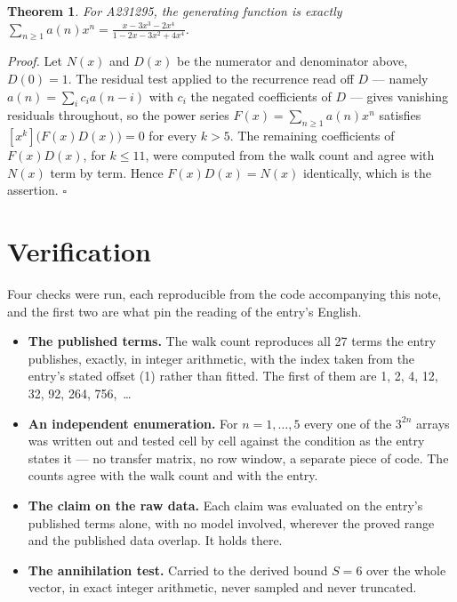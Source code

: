 \documentclass[11pt]{article}
\newtheorem{theorem}{Theorem}
\theoremstyle{definition}
\begin{document}
\begin{theorem} For A231295, the generating function is exactly $\sum_{n\ge 1} a(n)x^n = \frac{x - 3x^{3} - 2x^{4}}{1 - 2x - 3x^{2} + 4x^{4}}$.\end{theorem}

{\itshape Proof.} Let $N(x)$ and $D(x)$ be the numerator and denominator above, $D(0)=1$. The residual test applied to the recurrence read off $D$ --- namely $a(n) = \sum_i c_i a(n-i)$ with $c_i$ the negated coefficients of $D$ --- gives vanishing residuals throughout, so the power series $F(x)=\sum_{n\ge 1}a(n)x^n$ satisfies $[x^k]\bigl(F(x)D(x)\bigr) = 0$ for every $k > 5$. The remaining coefficients of $F(x)D(x)$, for $k \le 11$, were computed from the walk count and agree with $N(x)$ term by term. Hence $F(x)D(x) = N(x)$ identically, which is the assertion. $\square$

\section{Verification}

Four checks were run, each reproducible from the code accompanying this note, and the first two are what pin the reading of the entry's English.

\begin{itemize}

\item {\bfseries The published terms.} The walk count reproduces all 27 terms the entry publishes, exactly, in integer arithmetic, with the index taken from the entry's stated offset (1) rather than fitted. The first of them are 1, 2, 4, 12, 32, 92, 264, 756,~\dots

\item {\bfseries An independent enumeration.} For $n = 1,\dots,5$ every one of the $3^{2n}$ arrays was written out and tested cell by cell against the condition as the entry states it --- no transfer matrix, no row window, a separate piece of code. The counts agree with the walk count and with the entry.

\item {\bfseries The claim on the raw data.} Each claim was evaluated on the entry's published terms alone, with no model involved, wherever the proved range and the published data overlap. It holds there.

\item {\bfseries The annihilation test.} Carried to the derived bound $S = 6$ over the whole vector, in exact integer arithmetic, never sampled and never truncated.

\end{itemize}
\end{document}
